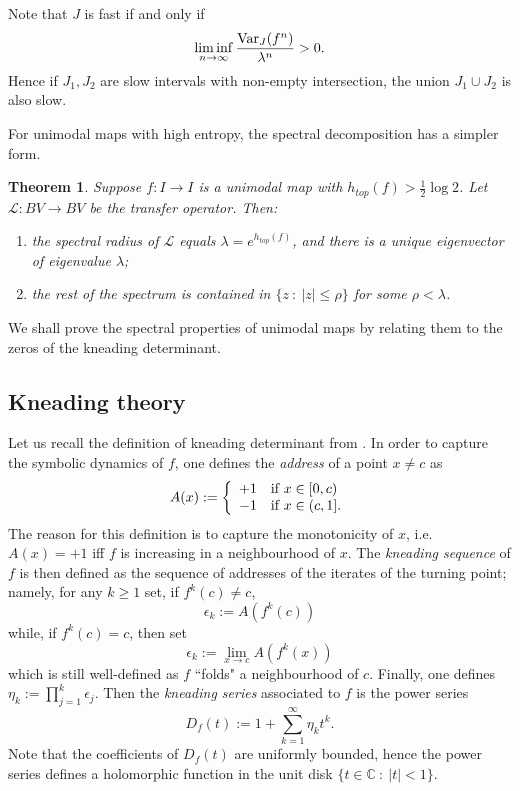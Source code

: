 \documentclass[11pt]{amsart}
\newtheorem{theorem}{Theorem}[section]
\newcommand{\var}[2]{\textup{Var}_{#2}(#1)}
\begin{document}
Note that $J$ is fast if and only if 
$$\liminf_{n \to \infty} \frac{\var{f^n}{J}}{\lambda^n} > 0.$$
Hence if $J_1, J_2$ are slow intervals with non-empty intersection, the union $J_1 \cup J_2$ is also slow. 

\bigskip

For unimodal maps with high entropy, the spectral decomposition has a simpler form.

\begin{theorem} \label{T:unispectrum}
Suppose $f : I \to I$ is a unimodal map with $h_{top}(f) > \frac{1}{2} \log 2$.
Let $\mathcal{L} : BV \to BV$ be the transfer operator. Then: 
\begin{enumerate}
\item the spectral radius of $\mathcal{L}$ equals $\lambda = e^{h_{top}(f)}$, and 
there is a unique eigenvector of eigenvalue $\lambda$; 
\item the rest of the spectrum is contained in $\{ z \ : \ |z| \leq \rho \}$ for some $\rho < \lambda$.
\end{enumerate}
\end{theorem}

We shall prove the spectral properties of unimodal maps by relating them to the zeros of the kneading determinant. 

\subsection*{Kneading theory}
Let us recall the definition of kneading determinant from \cite{MT}. 
In order to capture the symbolic dynamics of 
$f$, one defines the \emph{address} of a point $x \neq c$ as 
$$A(x)  := \left\{ \begin{array}{ll} +1 & \textup{if }  x \in [0, c) \\ 
-1 & \textup{if } x \in (c, 1]. 
\end{array} \right.$$
The reason for this definition is to capture the monotonicity of $x$, i.e. $A(x) = +1$ iff $f$ is increasing in a neighbourhood of $x$. 
The \emph{kneading sequence} of $f$ is then defined as the sequence of addresses of the iterates of the turning point; namely, 
for any $k \geq 1$ set, if $f^k(c) \neq c$, 
$$\epsilon_k := A(f^k(c))$$
while, if $f^k(c) = c$, then set 
$$\epsilon_k := \lim_{x \to c} A(f^k(x))$$
which is still well-defined as $f$ ``folds" a neighbourhood of $c$. Finally, one defines 
$\eta_k := \prod_{j = 1}^k \epsilon_j$.
Then the \emph{kneading series} associated to $f$ is the power series 
$$D_f(t) := 1 + \sum_{k = 1}^\infty  \eta_{k} t^k.$$
Note that the coefficients of $D_f(t)$ are uniformly bounded, hence the power series 
defines a holomorphic function in the unit disk $\{ t \in \mathbb{C} \ : \ |t| < 1\}$. 
\end{document}
